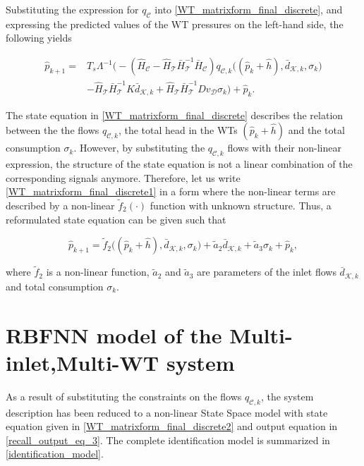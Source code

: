 Substituting the expression for $q_{\mathcal{C}}$ into \eqref{WT_matrixform_final_discrete}, and expressing the predicted values of the WT pressures on the left-hand side, the following yields

\vspace{-4mm}
\begin{align}
\label{WT_matrixform_final_discrete1}
\nonumber  \hat{p}_{k+1}  =& T_s \Lambda^{-1} \big(- (\hat{H}_{\mathcal{C}} - \hat{H}_{\mathcal{T}} \bar{H}^{-1}_{\mathcal{T}}\bar{H}_{\mathcal{C}})  q_{\mathcal{C},k}\big ((\hat{p}_k + \hat{h}),\bar{d}_{\mathcal{K},k}, \sigma_k \big) \\ & - \hat{H}_{\mathcal{T}} \bar{H}^{-1}_{\mathcal{T}} K \bar{d}_{\mathcal{K},k} + \hat{H}_{\mathcal{T}} \bar{H}^{-1}_{\mathcal{T}} D v_{\mathcal{D}} \sigma_k \big) + \hat{p}_k .
\end{align}
\vspace{-4mm}


The state equation in \eqref{WT_matrixform_final_discrete} describes the relation between the the flows $q_{\mathcal{C},k}$, the total head in the WTs $(\hat{p}_k + \hat{h})$ and the total consumption $\sigma_k$. However, by substituting the $q_{\mathcal{C},k}$ flows with their non-linear expression, the structure of the state equation is not a linear combination of the corresponding signals anymore. Therefore, let us write \eqref{WT_matrixform_final_discrete1} in a form where the non-linear terms are described by a non-linear $\tilde{f}_2(\cdot)$ function with unknown structure. Thus, a reformulated state equation can be given such that

 \begin{equation}
  \label{WT_matrixform_final_discrete2}
     \hat{p}_{k+1}  = \tilde{f}_2 \big((\hat{p}_k + \hat{h}),\bar{d}_{\mathcal{K},k}, \sigma_k\big) + \tilde{a}_2 \bar{d}_{\mathcal{K},k} + \tilde{a}_3 \sigma_k + \hat{p}_k,
\end{equation} 


where $\tilde{f}_2$ is a non-linear function, $\tilde{a}_2$ and $\tilde{a}_3$ are parameters of the inlet flows $\bar{d}_{\mathcal{K},k}$ and total consumption $\sigma_k$. 


\section{RBFNN model of the Multi-inlet,Multi-WT system}
\label{RBFNN_model_multi_inlet_multi_WT_sys} 

As a result of substituting the constraints on the flows $q_{\mathcal{C},k}$, the system description has been reduced to a non-linear State Space model with state equation given in \eqref {WT_matrixform_final_discrete2} and output equation in \eqref {recall_output_eq_3}. The complete identification model is summarized in \eqref{identification_model}. 

